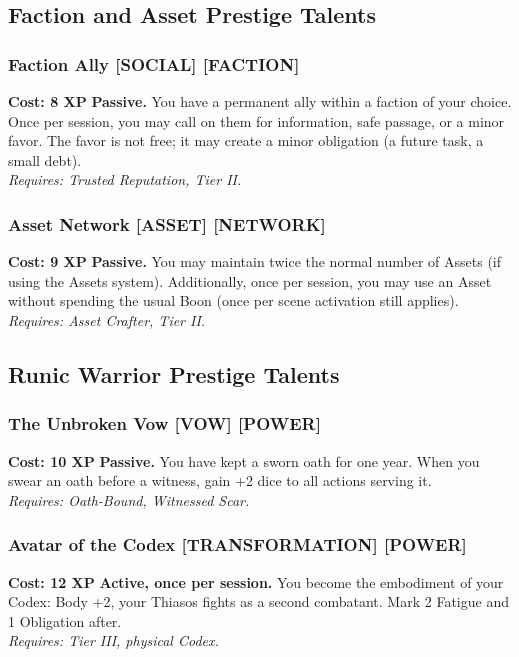\documentclass[12pt,a4paper]{book}
\begin{document}
\subsection*{Faction and Asset Prestige Talents}
\label{sec:prestige-faction}

\subsubsection*{Faction Ally \textnormal{[SOCIAL] [FACTION]}}
\label{talent:faction-ally}
\textbf{Cost: 8 XP} \textbf{Passive.} You have a permanent ally within a faction of your choice. Once per session, you may call on them for information, safe passage, or a minor favor. The favor is not free; it may create a minor obligation (a future task, a small debt). \\
\textit{Requires: Trusted Reputation, Tier II.}

\subsubsection*{Asset Network \textnormal{[ASSET] [NETWORK]}}
\label{talent:asset-network}
\textbf{Cost: 9 XP} \textbf{Passive.} You may maintain twice the normal number of Assets (if using the Assets system). Additionally, once per session, you may use an Asset without spending the usual Boon (once per scene activation still applies). \\
\textit{Requires: Asset Crafter, Tier II.}

\subsection*{Runic Warrior Prestige Talents}
\label{sec:prestige-runic-warrior}

\subsubsection*{The Unbroken Vow \textnormal{[VOW] [POWER]}}
\label{talent:unbroken-vow}
\textbf{Cost: 10 XP} \textbf{Passive.} You have kept a sworn oath for one year. When you swear an oath before a witness, gain +2 dice to all actions serving it. \\
\textit{Requires: Oath-Bound, Witnessed Scar.}

\subsubsection*{Avatar of the Codex \textnormal{[TRANSFORMATION] [POWER]}}
\label{talent:avatar-of-the-codex}
\textbf{Cost: 12 XP} \textbf{Active, once per session.} You become the embodiment of your Codex: Body +2, your Thiasos fights as a second combatant. Mark 2 Fatigue and 1 Obligation after. \\
\textit{Requires: Tier III, physical Codex.}
\end{document}
